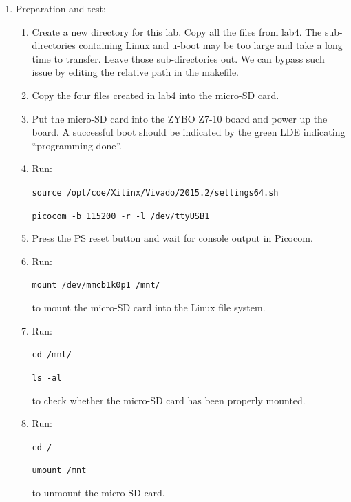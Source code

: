 \documentclass[11pt,letterpaper,titlepage]{article}
\begin{document}
\begin{enumerate}
    
    \item Preparation and test:
    
    \begin{enumerate}
        
        \item Create a new directory for this lab. Copy all the files from lab4. The sub-directories containing Linux and u-boot may be too large and take a long time to transfer. Leave those sub-directories out. We can bypass such issue by editing the relative path in the makefile.
        
        \item Copy the four files created in lab4 into the micro-SD card.
        
        \item Put the micro-SD card into the ZYBO Z7-10 board and power up the board. A successful boot should be indicated by the green LDE indicating ``programming done''.
        
        \item Run:
        
        \verb|source /opt/coe/Xilinx/Vivado/2015.2/settings64.sh|
        
        \verb|picocom -b 115200 -r -l /dev/ttyUSB1|
        
        \item Press the PS reset button and wait for console output in Picocom.
        
        \item Run:
        
        \verb|mount /dev/mmcb1k0p1 /mnt/|
        
        to mount the micro-SD card into the Linux file system.
        
        \item Run:
        
        \verb|cd /mnt/|
        
        \verb|ls -al|
        
        to check whether the micro-SD card has been properly mounted.
        
        \item Run:
        
        \verb|cd /|
        
        \verb|umount /mnt|
        
        to unmount the micro-SD card.
        

\end{enumerate}
\end{enumerate}
\end{document}
